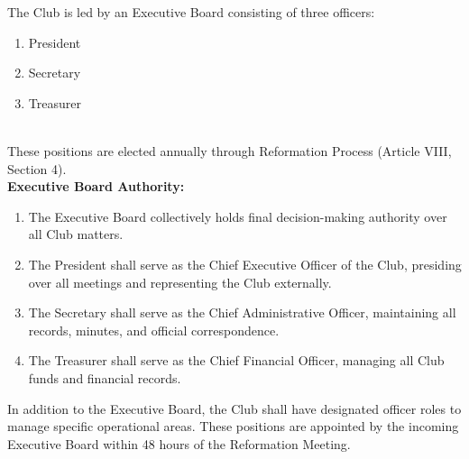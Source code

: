 

The Club is led by an Executive Board consisting of three officers:
\begin{enumerate}[label=\arabic*. , leftmargin=2em, itemsep=0.3em]
    \item President
    \item Secretary
    \item Treasurer
\end{enumerate}
\\
These positions are elected annually through Reformation Process (Article VIII, Section 4).
\\
\textbf{Executive Board Authority:}
\begin{enumerate}[label=\alph*), leftmargin=2em, itemsep=0.3em]
    \item The Executive Board collectively holds final decision-making authority over all Club matters.
    \item The President shall serve as the Chief Executive Officer of the Club, presiding over all meetings and representing the Club externally.
    \item The Secretary shall serve as the Chief Administrative Officer, maintaining all records, minutes, and official correspondence.
    \item The Treasurer shall serve as the Chief Financial Officer, managing all Club funds and financial records.
\end{enumerate}


In addition to the Executive Board, the Club shall have designated officer roles to manage specific operational areas. These positions are appointed by the incoming Executive Board within 48 hours of the Reformation Meeting.

